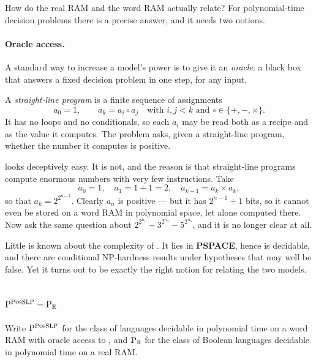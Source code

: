 How do the real RAM and the word RAM actually relate? For polynomial-time
decision problems there is a precise answer, and it needs two notions.

\paragraph{Oracle access.}
A standard way to increase a model's power is to give it an \emph{oracle}: a
black box that answers a fixed decision problem in one step, for any input.

\begin{definition}\label{def:slp}
A \emph{straight-line program} is a finite sequence of assignments
\[ a_0 = 1, \qquad a_k = a_i \circ a_j \quad
   \text{with } i,j < k \text{ and } \circ \in \{+,-,\times\}. \]
It has no loops and no conditionals, so each $a_i$ may be read both as a
recipe and as the value it computes. The problem  asks, given a
straight-line program, whether the number it computes is positive.
\end{definition}

 looks deceptively easy. It is not, and the reason is that
straight-line programs compute enormous numbers with very few instructions.
Take
\[ a_0 = 1, \quad a_1 = 1+1 = 2, \quad a_{k+1} = a_k \times a_k, \]
so that $a_k = 2^{2^{k-1}}$. Clearly $a_n$ is positive --- but it has
$2^{n-1}+1$ bits,
so it cannot even be stored on a word RAM in polynomial space, let alone
computed there. Now ask the same question about
$2^{2^{n_1}} - 3^{2^{n_2}} - 5^{2^{n_3}}$, and it is no longer clear at all.

Little is known about the complexity of . It lies in
\textbf{PSPACE}, hence is decidable, and there are conditional NP-hardness
results under hypotheses that may well be false. Yet it turns out to be exactly
the right notion for relating the two models.

\subsection{\texorpdfstring{$\mathrm{P}^{\textsc{PosSLP}} = \mathrm{P}_{\mathbb{R}}$}{P with a PosSLP oracle equals P over the reals}}
\label{sec:posslp-pr}

Write $\mathrm{P}^{\textsc{PosSLP}}$ for the class of languages decidable in
polynomial time on a word RAM with oracle access to , and
$\mathrm{P}_{\mathbb{R}}$ for the class of Boolean languages decidable in polynomial
time on a real RAM.

